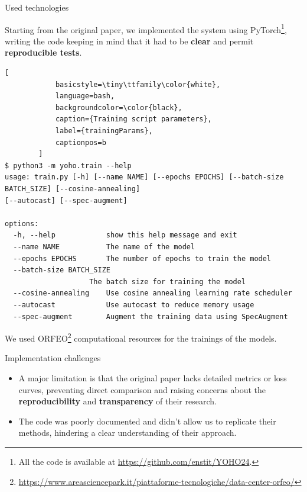 	\begin{frame}[fragile]{Used technologies}
	
		Starting from the original paper, we implemented the system using PyTorch\footnote{All the code is available at
		\url{https://github.com/enstit/YOHO24}.}, writing the code keeping in mind that it had to be \textbf{clear} and
		permit \textbf{reproducible tests}.
		
		\begin{lstlisting}[
			basicstyle=\tiny\ttfamily\color{white},
			language=bash,
			backgroundcolor=\color{black},
			caption={Training script parameters},
			label={trainingParams},
			captionpos=b
		]
$ python3 -m yoho.train --help
usage: train.py [-h] [--name NAME] [--epochs EPOCHS] [--batch-size BATCH_SIZE] [--cosine-annealing]
[--autocast] [--spec-augment]

options:
  -h, --help            show this help message and exit
  --name NAME           The name of the model
  --epochs EPOCHS       The number of epochs to train the model
  --batch-size BATCH_SIZE    
	                The batch size for training the model		  
  --cosine-annealing    Use cosine annealing learning rate scheduler
  --autocast            Use autocast to reduce memory usage
  --spec-augment        Augment the training data using SpecAugment
		\end{lstlisting}

		We used ORFEO\footnote{\url{https://www.areasciencepark.it/piattaforme-tecnologiche/data-center-orfeo/}}
		computational resources for the trainings of the models.
		
	\end{frame}
	
	\begin{frame}{Implementation challenges}

	\begin{itemize}
		\item {A major limitation is that the original paper lacks detailed metrics or loss curves, preventing direct
			comparison and raising concerns about the \textbf{reproducibility} and \textbf{transparency} of their
			research.}
		\item {The code was poorly documented and didn’t allow us to replicate their methods, hindering a clear
			understanding of their approach.}
	\end{itemize}

	\end{frame}

